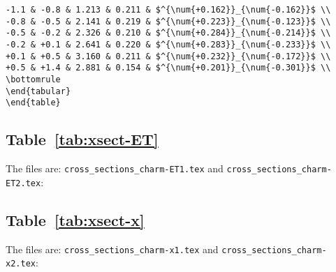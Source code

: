 \documentclass[UKenglish,texlive=2016]{\ATLASLATEXPATH atlasdoc}
\begin{document}
\begin{verbatim}
-1.1 & -0.8 & 1.213 & 0.211 & $^{\num{+0.162}}_{\num{-0.162}}$ \\
-0.8 & -0.5 & 2.141 & 0.219 & $^{\num{+0.223}}_{\num{-0.123}}$ \\
-0.5 & -0.2 & 2.326 & 0.210 & $^{\num{+0.284}}_{\num{-0.214}}$ \\
-0.2 & +0.1 & 2.641 & 0.220 & $^{\num{+0.283}}_{\num{-0.233}}$ \\
+0.1 & +0.5 & 3.160 & 0.211 & $^{\num{+0.232}}_{\num{-0.172}}$ \\
+0.5 & +1.4 & 2.881 & 0.154 & $^{\num{+0.201}}_{\num{-0.301}}$ \\
\bottomrule
\end{tabular}
\end{table}
\end{verbatim}

\subsection{Table~\protect\ref{tab:xsect-ET}}
The files are: \texttt{cross\_sections\_charm-ET1.tex} and
\texttt{cross\_sections\_charm-ET2.tex}:
{\scriptsize
  
}
{\scriptsize
  
}

\subsection{Table~\protect\ref{tab:xsect-x}}

The files are: \texttt{cross\_sections\_charm-x1.tex} and
\texttt{cross\_sections\_charm-x2.tex}:
{\scriptsize
  
}
{\tiny
  
}
\end{document}
